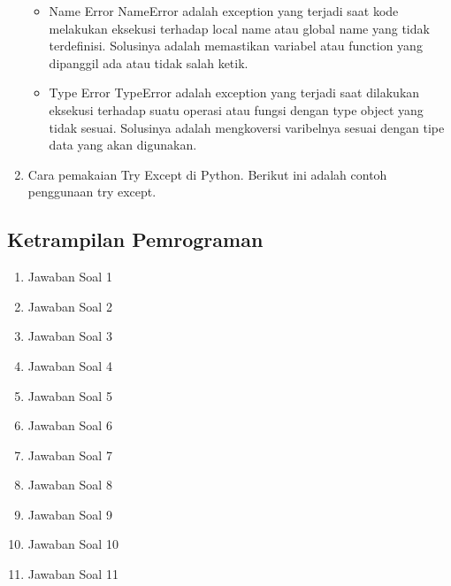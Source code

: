 \begin{enumerate}
\begin{itemize}
\item Name Error
NameError adalah exception yang terjadi saat kode melakukan eksekusi terhadap local name atau global name yang tidak terdefinisi. Solusinya adalah memastikan variabel atau function yang dipanggil ada atau tidak salah ketik.

\item Type Error
TypeError adalah exception yang terjadi saat dilakukan eksekusi terhadap suatu operasi atau fungsi dengan type object yang tidak sesuai. Solusinya adalah mengkoversi varibelnya sesuai dengan tipe data yang akan digunakan.

\end{itemize}

\item Cara pemakaian Try Except di Python.
Berikut ini adalah contoh penggunaan try except.


\end{enumerate}
\hfill \break

\subsection{Ketrampilan Pemrograman}

\begin{enumerate}
\item Jawaban Soal 1


\item Jawaban Soal 2


\item Jawaban Soal 3


\item Jawaban Soal 4


\item Jawaban Soal 5


\item Jawaban Soal 6


\item Jawaban Soal 7


\item Jawaban Soal 8


\item Jawaban Soal 9


\item Jawaban Soal 10


\item Jawaban Soal 11


\end{enumerate}
\hfill \break

